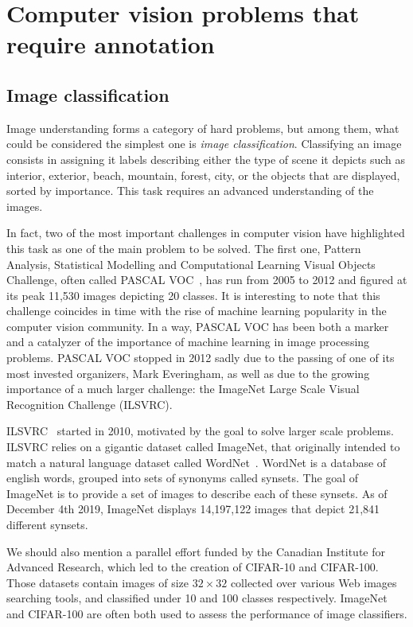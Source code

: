 \section{Computer vision problems that require annotation}%
\label{sec:cv_annot}

\subsection{Image classification}

Image understanding forms a category of hard problems, but among them,
what could be considered the simplest one is \textit{image classification}.
Classifying an image consists in assigning it
labels describing either the type of scene it depicts
such as interior, exterior, beach, mountain, forest, city,
or the objects that are displayed, sorted by importance.
This task requires an advanced understanding of the images.

In fact, two of the most important challenges in computer vision
have highlighted this task as one of the main problem to be solved.
The first one, Pattern Analysis, Statistical Modelling and Computational
Learning Visual Objects Challenge, often called PASCAL VOC~\cite{Everingham10},
has run from 2005 to 2012 and figured at its peak 11,530 images depicting 20 classes.
It is interesting to note that this challenge coincides in time
with the rise of machine learning popularity in the computer vision community.
In a way, PASCAL VOC has been both a marker and a catalyzer of the importance
of machine learning in image processing problems.
PASCAL VOC stopped in 2012 sadly due to
the passing of one of its most invested organizers, Mark Everingham,
as well as due to the growing importance of a much larger challenge:
the ImageNet Large Scale Visual Recognition Challenge (ILSVRC).

ILSVRC~\cite{ILSVRC15} started in 2010,
motivated by the goal to solve larger scale problems.
ILSVRC relies on a gigantic dataset called ImageNet,
that originally intended to match a natural language
dataset called WordNet~\cite{miller1995wordnet}.
WordNet is a database of english words, grouped into sets of synonyms called synsets.
The goal of ImageNet is to provide a set of images to describe each of these synsets.
As of December 4th 2019, ImageNet displays 14,197,122 images that depict 21,841 different synsets.

We should also mention a parallel effort funded by
the Canadian Institute for Advanced Research,
which led to the creation of CIFAR-10 and CIFAR-100.
Those datasets contain images of size $32 \times 32$ collected
over various Web images searching tools,
and classified under 10 and 100 classes respectively.
ImageNet and CIFAR-100 are often both used to assess the performance of image classifiers.

